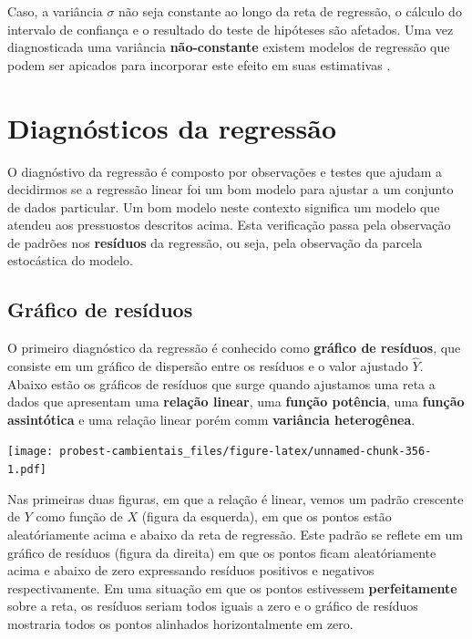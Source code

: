 \documentclass[
]{book}
\begin{document}
Caso, a variância \(\sigma\) não seja constante ao longo da reta de regressão, o cálculo do intervalo de confiança e o resultado do teste de hipóteses são afetados. Uma vez diagnosticada uma variância \textbf{não-constante} existem modelos de regressão que podem ser apicados para incorporar este efeito em suas estimativas \citep{zuur2009mixed}.

\hypertarget{diagnuxf3sticos-da-regressuxe3o}{%
\section{Diagnósticos da regressão}\label{diagnuxf3sticos-da-regressuxe3o}}

O diagnóstivo da regressão é composto por observações e testes que ajudam a decidirmos se a regressão linear foi um bom modelo para ajustar a um conjunto de dados particular. Um bom modelo neste contexto significa um modelo que atendeu aos pressuostos descritos acima. Esta verificação passa pela observação de padrões nos \textbf{resíduos} da regressão, ou seja, pela observação da parcela estocástica do modelo.

\hypertarget{gruxe1fico-de-resuxedduos}{%
\subsection{Gráfico de resíduos}\label{gruxe1fico-de-resuxedduos}}

O primeiro diagnóstico da regressão é conhecido como \textbf{gráfico de resíduos}, que consiste em um gráfico de dispersão entre os resíduos e o valor ajustado \(\hat{Y}\). Abaixo estão os gráficos de resíduos que surge quando ajustamos uma reta a dados que apresentam uma \textbf{relação linear}, uma \textbf{função potência}, uma \textbf{função assintótica} e uma relação linear porém comm \textbf{variância heterogênea}.

\texttt{[image: probest-cambientais\_files/figure-latex/unnamed-chunk-356-1.pdf]}

Nas primeiras duas figuras, em que a relação é linear, vemos um padrão crescente de \(Y\) como função de \(X\) (figura da esquerda), em que os pontos estão aleatóriamente acima e abaixo da reta de regressão. Este padrão se reflete em um gráfico de resíduos (figura da direita) em que os pontos ficam aleatóriamente acima e abaixo de zero expressando resíduos positivos e negativos respectivamente. Em uma situação em que os pontos estivessem \textbf{perfeitamente} sobre a reta, os resíduos seriam todos iguais a zero e o gráfico de resíduos mostraria todos os pontos alinhados horizontalmente em zero.
\end{document}
